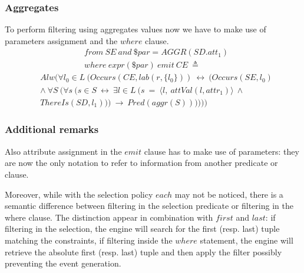 \subsubsection{Aggregates}
To perform filtering using aggregates values now we have to make use of parameters assignment and the $where$ clause.
\begin{align*}%
&from\ SE\ and\ \$par = AGGR(SD.att_1)\\
&where\ expr(\$par)\ emit\ CE\ \triangleq
\end{align*}
\begin{align*}
&Alw(\forall l_0 \in L\ (Occurs(CE, lab(r, \{l_0\}))\ \leftrightarrow\ (Occurs(SE, l_0)\\
&\wedge\ \forall S\ (\forall s\ (s \in S\ \leftrightarrow\ \exists l \in L\ (s\ =\ \langle l,\ attVal(l, attr_1) \rangle\ \wedge\\
&ThereIs(SD, l_1)))\ \rightarrow\ Pred(aggr(S))))))
\end{align*}

\subsubsection{Additional remarks}
Also attribute assignment in the $emit$ clause has to make use of parameters: they are now the only notation to refer to information from another predicate or clause.

Moreover, while with the selection policy $each$ may not be noticed, there is a semantic difference between filtering in the selection predicate or filtering in the where clause. The distinction appear in combination with $first$ and $last$: if filtering in the selection, the engine will search for the first (resp. last) tuple matching the constraints, if filtering inside the $where$ statement, the engine will retrieve the absolute first (resp. last) tuple and then apply the filter possibly preventing the event generation.
